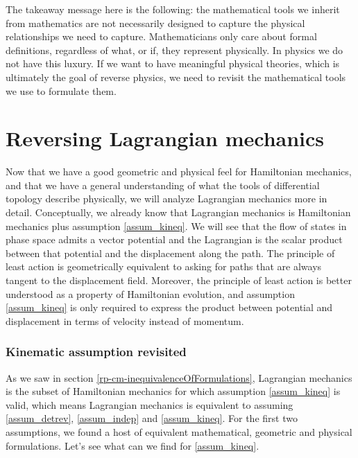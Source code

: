 The takeaway message here is the following: the mathematical tools we inherit from mathematics are not necessarily designed to capture the physical relationships we need to capture. Mathematicians only care about formal definitions, regardless of what, or if, they represent physically. In physics we do not have this luxury. If we want to have meaningful physical theories, which is ultimately the goal of reverse physics, we need to revisit the mathematical tools we use to formulate them.


\section{Reversing Lagrangian mechanics}

Now that we have a good geometric and physical feel for Hamiltonian mechanics, and that we have a general understanding of what the tools of differential topology describe physically, we will analyze Lagrangian mechanics more in detail. Conceptually, we already know that Lagrangian mechanics is Hamiltonian mechanics plus assumption \ref{assum_kineq}. We will see that the flow of states in phase space admits a vector potential and the Lagrangian is the scalar product between that potential and the displacement along the path. The principle of least action is geometrically equivalent to asking for paths that are always tangent to the displacement field. Moreover, the principle of least action is better understood as a property of Hamiltonian evolution, and assumption \ref{assum_kineq} is only required to express the product between potential and displacement in terms of velocity instead of momentum.

\subsubsection{Kinematic assumption revisited}

As we saw in section \ref{rp-cm-inequivalenceOfFormulations}, Lagrangian mechanics is the subset of Hamiltonian mechanics for which assumption \ref{assum_kineq} is valid, which means Lagrangian mechanics is equivalent to assuming \ref{assum_detrev}, \ref{assum_indep} and \ref{assum_kineq}. For the first two assumptions, we found a host of equivalent mathematical, geometric and physical formulations. Let's see what can we find for \ref{assum_kineq}.

